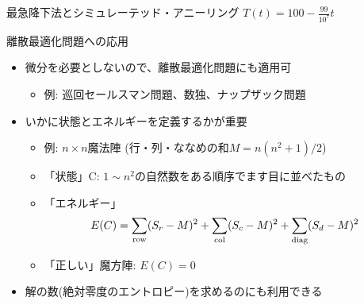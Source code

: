 \begin{frame}[t,fragile]{最急降下法とシミュレーテッド・アニーリング}
  \hspace*{17em}$T(t) = 100 - \frac{99}{10^7} t$
\end{frame}

\begin{frame}[t,fragile]{離散最適化問題への応用}
  \begin{itemize}
    \setlength{\itemsep}{1em}
  \item 微分を必要としないので、離散最適化問題にも適用可
    \begin{itemize}
    \item 例: 巡回セールスマン問題、数独、ナップザック問題
    \end{itemize}
  \item いかに状態とエネルギーを定義するかが重要
    \begin{itemize}
    \item 例: $n \times n$魔法陣 (行・列・ななめの和$M = n(n^2+1)/2$)
    \item 「状態」C: $1\sim n^2$の自然数をある順序でます目に並べたもの
    \item 「エネルギー」
      \[
      E(C) = \sum_{\rm row} (S_r-M)^2 + \sum_{\rm col} (S_c-M)^2 + \sum_{\rm diag} (S_d-M)^2
      \]
    \item 「正しい」魔方陣: $E(C) = 0$
    \end{itemize}
  \item 解の数(絶対零度のエントロピー)を求めるのにも利用できる
  \end{itemize}
\end{frame}
